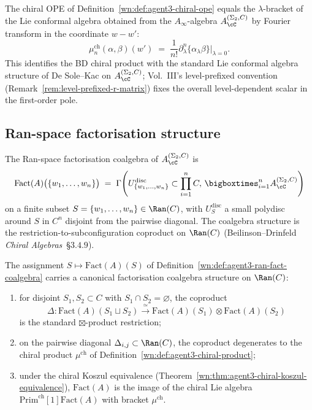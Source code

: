 \begin{remark}
\label{wn:rem:agent3-ope-lambda-bracket}
The chiral OPE of Definition~\ref{wn:def:agent3-chiral-ope} equals the $\lambda$-bracket of the Lie conformal algebra obtained from the $A_\infty$-algebra $A^{(\Sigma_2,C)}_\cC$ by Fourier transform in the coordinate $w-w'$:
\[
 \mu^{\mathrm{ch}}_n(\alpha,\beta)(w')
 \;=\;
 \frac{1}{n!}\partial_\lambda^n\{\alpha_\lambda\beta\}\Big|_{\lambda=0}.
\]
This identifies the BD chiral product with the standard Lie conformal algebra structure of De Sole--Kac on $A^{(\Sigma_2,C)}_\cC$; Vol.~III's level-prefixed convention (Remark~\ref{rem:level-prefixed-r-matrix}) fixes the overall level-dependent scalar in the first-order pole.
\end{remark}

\subsection{Ran-space factorisation structure}
\label{wn:subsec:agent3-ran-factorisation}

\begin{definition}
\label{wn:def:agent3-ran-fact-coalgebra}
The Ran-space factorisation coalgebra of $A^{(\Sigma_2,C)}_\cC$ is
\[
 \mathrm{Fact}(A)\bigl(\{w_1,\dots,w_n\}\bigr)
 \;=\;
 \Gamma\!\left(
 U_{\{w_1,\dots,w_n\}}^{\mathrm{disc}}\subset\prod_{i=1}^n C,\,
 \bigboxtimes_{i=1}^n A^{(\Sigma_2,C)}_\cC
 \right)
\]
on a finite subset $S=\{w_1,\dots,w_n\}\in\Ran(C)$, with $U_S^{\mathrm{disc}}$ a small polydisc around $S$ in $C^n$ disjoint from the pairwise diagonal. The coalgebra structure is the restriction-to-subconfiguration coproduct on $\Ran(C)$ (Beilinson--Drinfeld \emph{Chiral Algebras}~\S$3.4.9$).
\end{definition}

\begin{theorem}
\label{wn:thm:agent3-factorisation-on-ran}
\ClaimStatusProvedHere
The assignment $S\mapsto\mathrm{Fact}(A)(S)$ of Definition~\ref{wn:def:agent3-ran-fact-coalgebra} carries a canonical factorisation coalgebra structure on $\Ran(C)$:
\begin{enumerate}[label=\textup{(\roman*)}]
 \item for disjoint $S_1,S_2\subset C$ with $S_1\cap S_2=\varnothing$, the coproduct
 \[
 \Delta\colon\mathrm{Fact}(A)(S_1\sqcup S_2)
 \xrightarrow{\;\simeq\;}
 \mathrm{Fact}(A)(S_1)\otimes\mathrm{Fact}(A)(S_2)
 \]
 is the standard $\boxtimes$-product restriction;
 \item on the pairwise diagonal $\Delta_{i,j}\subset\Ran(C)$, the coproduct degenerates to the chiral product $\mu^{\mathrm{ch}}$ of Definition~\ref{wn:def:agent3-chiral-product};
 \item under the chiral Koszul equivalence (Theorem~\ref{wn:thm:agent3-chiral-koszul-equivalence}), $\mathrm{Fact}(A)$ is the image of the chiral Lie algebra $\mathrm{Prim}^{\mathrm{ch}}[1]\mathrm{Fact}(A)$ with bracket $\mu^{\mathrm{ch}}$.
\end{enumerate}
\end{theorem}

